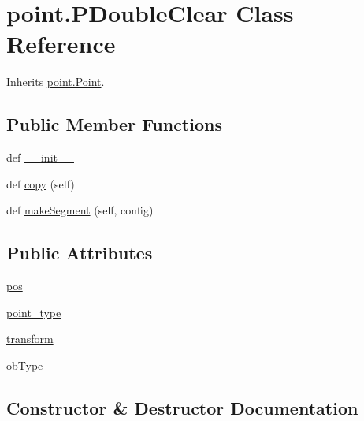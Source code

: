 \hypertarget{classpoint_1_1_p_double_clear}{}\section{point.\+P\+Double\+Clear Class Reference}
\label{classpoint_1_1_p_double_clear}


Inherits \hyperlink{classpoint_1_1_point}{point.\+Point}.

\subsection*{Public Member Functions}
\begin{DoxyCompactItemize}
\item 
def \hyperlink{classpoint_1_1_p_double_clear_a1ae945501703f49143c9c9aebe3596d7}{\+\_\+\+\_\+init\+\_\+\+\_\+}
\item 
def \hyperlink{classpoint_1_1_p_double_clear_a5337110414ba0c0d88bf950fbd9f1571}{copy} (self)
\item 
def \hyperlink{classpoint_1_1_p_double_clear_a53a7b2f8c9f5c8104bb4c58c6a767428}{make\+Segment} (self, config)
\end{DoxyCompactItemize}
\subsection*{Public Attributes}
\begin{DoxyCompactItemize}
\item 
\hyperlink{classpoint_1_1_p_double_clear_ad349fbcbf216675a5c33ad59eda87fc9}{pos}
\item 
\hyperlink{classpoint_1_1_p_double_clear_af5eeea4a2fbc7d0120ea721984a3feae}{point\+\_\+type}
\item 
\hyperlink{classpoint_1_1_p_double_clear_a59e98444f472f8413c8d0cf8531c2530}{transform}
\item 
\hyperlink{classpoint_1_1_p_double_clear_a5541242e024d4ff0b279d79bd6f6dce6}{ob\+Type}
\end{DoxyCompactItemize}


\subsection{Constructor \& Destructor Documentation}
\hypertarget{classpoint_1_1_p_double_clear_a1ae945501703f49143c9c9aebe3596d7}{}
